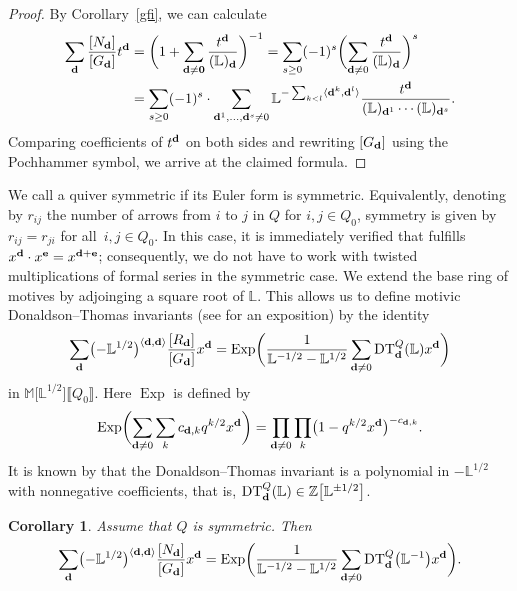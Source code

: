 \documentclass[10pt,a4paper]{amsart}
\numberwithin{equation}{section}
\newtheorem{Corollary}[Theorem]{Corollary}
\theoremstyle{definition}
\begin{document}
\begin{proof} By Corollary~\ref{gfi}, we can calculate
\begin{align*}
\sum_{\bf d}\frac{[N_{\bf d}]}{[G_{\bf d}]}t^{\bf d}&=\biggl(1+\sum_{\bf d\not={0}}\frac{t^{\bf d}}{(\mathbb{L})_{\bf d}}\biggr)^{-1}=\sum_{s\geq 0}(-1)^s\biggl(\sum_{{\bf d}\not=0}\frac{t^{\bf d}}{(\mathbb{L})_{\bf d}}\biggr)^s\\
&=\sum_{s\geq 0}(-1)^s\cdot
\sum_{{\bf d}^1,\dots,{\bf d}^s\not=0}\mathbb{L}^{-\sum_{k<l}\langle{\bf d}^k,{\bf d}^l\rangle}
\frac{t^{\bf d}}{(\mathbb{L})_{{\bf d}^1}\cdots(\mathbb{L})_{{\bf d}^s}}.
\end{align*}
Comparing coefficients of $t^{\bf d}$ on both sides and rewriting $[G_{\bf d}]$ using the Pochhammer symbol, we arrive at the claimed formula.\end{proof}

We call a quiver symmetric if its Euler form is symmetric. Equivalently, denoting by $r_{ij}$ the number of arrows from $i$ to $j$ in $Q$ for $i,j\in Q_0$, symmetry is given by $r_{ij}=r_{ji}$ for all~${i,j\in Q_0}$. In this case, it is immediately verified that
 fulfills $x^{\bf d}\cdot x^{\bf e}=x^{{\bf d}+{\bf e}}$; consequently, we do not have to work with twisted multiplications of formal series in the symmetric case. We extend the base ring of motives by adjoinging a square root of $\mathbb{L}$. This allows us to define motivic Donaldson--Thomas invariants (see \cite{RDT} for an exposition) by the identity
\[\sum_{\mathbf d}\bigl(-\mathbb{L}^{1/2}\bigr)^{\langle\mathbf{d},\mathbf{d}\rangle}\frac{[R_\mathbf{d}]}{[G_\mathbf{d}]}x^\mathbf{d} =\operatorname{Exp}\biggl(\frac{1}{\mathbb{L}^{-1/2}-\mathbb{L}^{1/2}}\sum_{\mathbf{d}\not=0}{\rm DT}^Q_\mathbf{d}(\mathbb{L}) x^\mathbf{d}\biggr)\]
in $\mathbb{M}\big[\mathbb{L}^{1/2}\big]\llbracket Q_0\rrbracket$. Here $\operatorname{Exp}$ is defined by
\[\operatorname{Exp}\biggl(\sum_{{\bf d}\not=0}\sum_kc_{{\bf d},k}q^{k/2}x^{\bf d}\biggr)=\prod_{{\bf d}\not=0}\prod_k\bigl(1-q^{k/2}x^{\bf d}\bigr)^{-c_{{\bf d},k}}.\]
It is known by \cite{E} that the Donaldson--Thomas invariant is a polynomial in $-\mathbb{L}^{1/2}$ with nonnegative coefficients, that is, ${\rm DT}^Q_\mathbf{d}(\mathbb{L})\in \mathbb{Z}\big[\mathbb{L}^{\pm 1/2}\big]$.

\begin{Corollary} Assume that $Q$ is symmetric. Then \[\sum_\mathbf{d}\bigl(-\mathbb{L}^{1/2}\bigr)^{\langle\mathbf{d},\mathbf{d}\rangle} \frac{[N_\mathbf{d}]}{[G_\mathbf{d}]}x^\mathbf{d}=\operatorname{Exp}\biggl(\frac{1}{\mathbb{L}^{-1/2}-\mathbb{L}^{1/2}}\sum_{\mathbf{d}\not=0}{\rm DT}^Q_{\bf d}\bigl(\mathbb{L}^{-1}\bigr)x^\mathbf{d}\biggr).\]
\end{Corollary}
\end{document}
